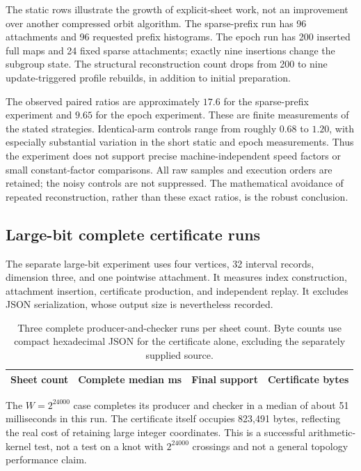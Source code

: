\documentclass[11pt]{article}
\theoremstyle{definition}
\begin{document}
The static rows illustrate the growth of explicit-sheet work, not an improvement over another compressed orbit algorithm. The sparse-prefix run has 96 attachments and 96 requested prefix histograms. The epoch run has 200 inserted full maps and 24 fixed sparse attachments; exactly nine insertions change the subgroup state. The structural reconstruction count drops from 200 to nine update-triggered profile rebuilds, in addition to initial preparation.

The observed paired ratios are approximately $17.6$ for the sparse-prefix experiment and $9.65$ for the epoch experiment. These are finite measurements of the stated strategies. Identical-arm controls range from roughly $0.68$ to $1.20$, with especially substantial variation in the short static and epoch measurements. Thus the experiment does not support precise machine-independent speed factors or small constant-factor comparisons. All raw samples and execution orders are retained; the noisy controls are not suppressed. The mathematical avoidance of repeated reconstruction, rather than these exact ratios, is the robust conclusion.

\subsection{Large-bit complete certificate runs}
The separate large-bit experiment uses four vertices, 32 interval records, dimension three, and one pointwise attachment. It measures index construction, attachment insertion, certificate production, and independent replay. It excludes JSON serialization, whose output size is nevertheless recorded.

\begin{table}[ht]
\centering\small
\begin{tabular}{lrrr}
\toprule
Sheet count & Complete median ms & Final support & Certificate bytes\\
\midrule

\end{tabular}
\caption{Three complete producer-and-checker runs per sheet count. Byte counts use compact hexadecimal JSON for the certificate alone, excluding the separately supplied source.}
\label{tab:large}
\end{table}

The $W=2^{24000}$ case completes its producer and checker in a median of about 51 milliseconds in this run. The certificate itself occupies 823,491 bytes, reflecting the real cost of retaining large integer coordinates. This is a successful arithmetic-kernel test, not a test on a knot with $2^{24000}$ crossings and not a general topology performance claim.
\end{document}
